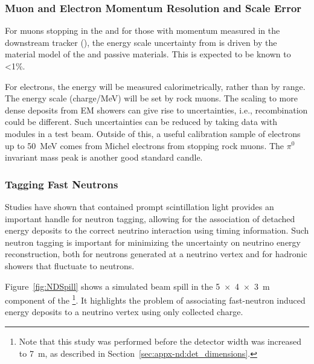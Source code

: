 \subsubsection{Muon and Electron Momentum Resolution and Scale Error}


For muons stopping in the  and for those with momentum measured in the downstream tracker (), the energy scale uncertainty from  is driven by the material model of the  and passive materials.  This is expected to be known to \textless 1\%.

For electrons, the energy will be measured calorimetrically, rather than by range.  The  energy scale (charge/MeV) will be set by rock muons.  The scaling to more dense deposits from EM showers can give rise to uncertainties, i.e., recombination could be different.  Such uncertainties can be reduced by taking data with  modules in a test beam.  Outside of this, a useful calibration sample
of electrons up to \SI{50}{MeV} comes from Michel electrons from stopping rock muons. The $\pi^0$ invariant mass peak is another good standard candle.



\subsubsection{Tagging Fast Neutrons}

Studies have shown that contained prompt scintillation light provides an important handle for neutron tagging, allowing for the association of detached energy deposits to the correct neutrino interaction using timing information. Such neutron tagging is important for minimizing the uncertainty on neutrino energy reconstruction, both for neutrons generated at a neutrino vertex and for hadronic showers that fluctuate to neutrons. 

Figure~\ref{fig:NDSpill} shows a simulated beam spill in the \SI[product-units=repeat]{5x4x3}{\metre}  component of the   \footnote{Note that this study was performed before the detector width was increased to \SI{7}{m}, as described in Section~\ref{sec:appx-nd:det_dimensions}.}. 
It highlights the problem of associating fast-neutron induced energy deposits to a neutrino vertex using only collected charge.  

